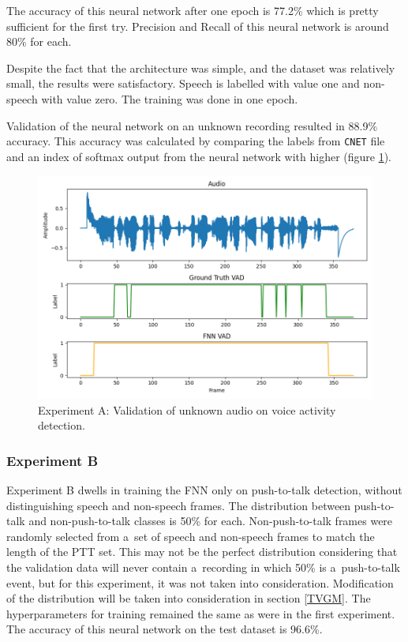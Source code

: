     The accuracy of this neural network after one epoch is 77.2\% which is pretty sufficient for the first try. Precision and Recall of this neural network is around 80\% for each.  
    
    Despite the fact that the architecture was simple, and the dataset was relatively small, the results were satisfactory. Speech is labelled with value one and non-speech with value zero. The training was done in one epoch.

    Validation of the neural network on an unknown recording resulted in 88.9\% accuracy. This accuracy was calculated by comparing the labels from \texttt{CNET} file and an index of softmax output from the neural network with higher (figure \ref{fig:validationFNN}).

    \begin{figure}[ht!]
        \centering
        \includegraphics[width = \textwidth]{obrazky-figures/FNNOUTPUT_10.png}
        \caption{Experiment A: Validation of unknown audio on voice activity detection.}
        \label{fig:validationFNN}
    \end{figure}
    \newpage
    \subsubsection{Experiment B}\label{expB}

    Experiment B dwells in training the FNN only on push-to-talk detection, without distinguishing speech and non-speech frames. The distribution between push-to-talk and non-push-to-talk classes is 50\% for each. Non-push-to-talk frames were randomly selected from a~set of speech and non-speech frames to match the length of the PTT set. This may not be the perfect distribution considering that the validation data will never contain a~recording in which 50\% is a~push-to-talk event, but for this experiment, it was not taken into consideration. Modification of the distribution will be taken into consideration in section \ref{TVGM}. The hyperparameters for training remained the same as were in the first experiment. The accuracy of this neural network on the test dataset is 96.6\%.

